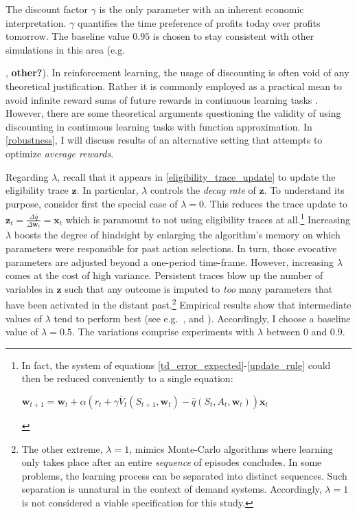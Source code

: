 The discount factor $\gamma$ is the only parameter with an inherent economic interpretation. $\gamma$ quantifies the time preference of profits today over profits tomorrow. The baseline value $0.95$ is chosen to stay consistent with other simulations in this area (e.g.\ {\textcite{calvano_algorithmic_2018}, \textcite{klein_autonomous_2019} \textbf{other?}). In reinforcement learning, the usage of discounting is often void of any theoretical justification. Rather it is commonly employed as a practical mean to avoid infinite reward sums of future rewards in continuous learning tasks \parencite{schwartz_reinforcement_1993}. However, there are some theoretical arguments questioning the validity of using discounting in continuous learning tasks with function approximation. In \autoref{robustness}, I will discuss results of an alternative setting that attempts to optimize \emph{average rewards}.

Regarding $\lambda$, recall that it appears in \autoref{eligibility_trace_update} to update the eligibility trace $\boldsymbol{z}$. In particular, $\lambda$ controls the \emph{decay rate} of $\boldsymbol{z}$. To understand its purpose, consider first the special case of $\lambda = 0$. This reduces the trace update to $\boldsymbol{z}_t = \frac{\Delta \hat{q}}{\Delta \boldsymbol{w}_t} = \boldsymbol{x}_t$ which is paramount to not using eligibility traces at all.\footnote{In fact, the system of equations \ref{td_error_expected}-\ref{update_rule} could then be reduced conveniently to a single equation:
	\begin{center}
		$\boldsymbol{w}_{t+1} = \boldsymbol{w}_t + \alpha (r_t + \gamma \bar{V}_t(S_{t+1}, \boldsymbol{w}_t) - \hat{q}(S_t, A_t, \boldsymbol{w}_t)) \boldsymbol{x}_t$
	\end{center}
} Increasing $\lambda$ boosts the degree of hindsight by enlarging the algorithm's memory on which parameters were responsible for past action selections. In turn, those evocative parameters are adjusted beyond a one-period time-frame. However, increasing $\lambda$ comes at the cost of high variance. Persistent traces blow up the number of variables in $\boldsymbol{z}$ such that any outcome is imputed to \emph{too} many parameters that have been activated in the distant past.\footnote{The other extreme, $\lambda = 1$, mimics Monte-Carlo algorithms where learning only takes place after an entire \emph{sequence} of episodes concludes. In some problems, the learning process can be separated into distinct sequences. Such separation is unnatural in the context of demand systems. Accordingly, $\lambda = 1$ is not considered a viable specification for this study.} Empirical results show that intermediate values of $\lambda$ tend to perform best (see e.g.\ \textcite{sutton_1988}, \textcite{rummery_niranjan_1994} and \textcite{sutton_reinforcement_2018}). Accordingly, I choose a baseline value of $\lambda = 0.5$. The variations comprise experiments with $\lambda$ between $0$ and $0.9$.

}
